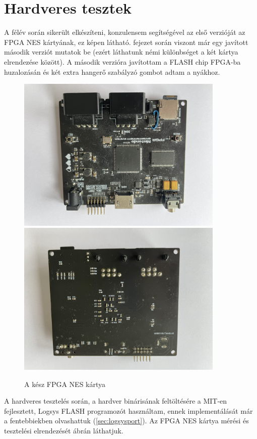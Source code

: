 \newpage
\section{Hardveres tesztek}

A félév során sikerült elkészíteni, konzulensem segítségével az első verzióját az FPGA NES kártyának, ez  képen látható.  fejezet során viszont már egy javított második verziót mutatok be (ezért láthatunk némi különbséget a két kártya elrendezése között). A második verzióra javítottam a FLASH chip FPGA-ba huzalozásán és két extra hangerő szabályzó gombot adtam a nyákhoz.

\begin{figure}[H]
	\centering
	\includegraphics[width=99mm, keepaspectratio, angle=90]{figures/nes-pcb-assembled-top}
	\includegraphics[width=99mm, keepaspectratio, angle=90]{figures/nes-pcb-assembled-botom}
	\caption{A kész FPGA NES kártya} 
	\label{fig:PCB-Assembled}
\end{figure}

A hardveres tesztelés során, a hardver binárisának feltöltésére a MIT-en fejlesztett, Logsys FLASH programozót használtam, ennek implementálását már a fentebbiekben olvashattuk (\ref{sec:logsysport}). Az FPGA NES kártya mérési és tesztelési elrendezését  ábrán láthatjuk. 

